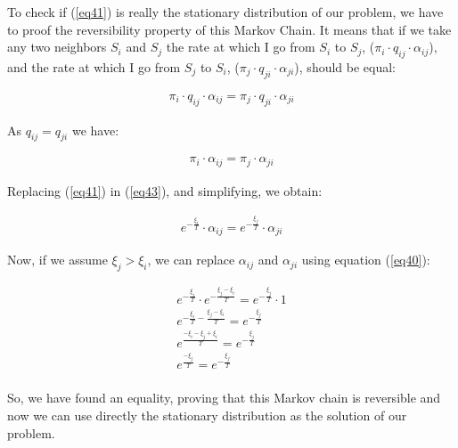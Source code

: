 To check if (\ref{eq41}) is really the stationary distribution of our problem, we have to proof the reversibility property of this Markov Chain. It means that if we take any two neighbors $S_i$ and $S_j$ the rate at which I go from $S_i$ to $S_j$, ($\pi_i \cdot q_{ij} \cdot \alpha_{ij}$), and the rate at which I go from $S_j$ to $S_i$, ($\pi_j \cdot q_{ji} \cdot \alpha_{ji}$), should be equal:

\begin{equation}
\begin{aligned}
\pi_i \cdot q_{ij} \cdot \alpha_{ij} = \pi_j \cdot q_{ji} \cdot \alpha_{ji}
\end{aligned}
\label{eq42}
\end{equation}

As $q_{ij} = q_{ji}$ we have: 

\begin{equation}
\begin{aligned}
\pi_i \cdot \alpha_{ij} = \pi_j \cdot \alpha_{ji}
\end{aligned}
\label{eq43}
\end{equation}

Replacing (\ref{eq41}) in (\ref{eq43}), and simplifying, we obtain:

\begin{equation}
\begin{aligned}
e^{-\frac{\xi_i}{T}} \cdot \alpha_{ij} = e^{-\frac{\xi_j}{T}} \cdot \alpha_{ji}
\end{aligned}
\label{eq44}
\end{equation}

Now, if we assume $\xi_j>\xi_i$, we can replace $\alpha_{ij}$ and $\alpha_{ji}$ using equation (\ref{eq40}):

\begin{equation}
\begin{aligned}
e^{-\frac{\xi_i}{T}} \cdot e^{-\frac{\xi_{j}-\xi_{i}}{T}} = e^{-\frac{\xi_j}{T}} \cdot 1 \\
e^{-\frac{\xi_i}{T}-\frac{\xi_{j}-\xi_{i}}{T}} = e^{-\frac{\xi_{j}}{T}} \\
e^{\frac{-\xi_i-\xi_{j}+\xi_{i}}{T}} = e^{-\frac{\xi_{j}}{T}} \\
e^{\frac{-\xi_{j}}{T}} = e^{-\frac{\xi_{j}}{T}} \\
\end{aligned}
\label{eq45}
\end{equation}

So, we have found an equality, proving that this Markov chain is reversible and now we can use directly the stationary distribution as the solution of our problem.

